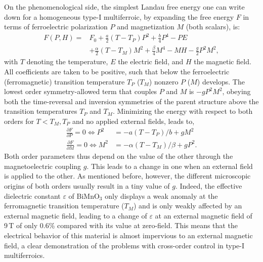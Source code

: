 On the phenomenological side, the simplest Landau free energy one can write down for a homogeneous type-I multiferroic, by expanding the free energy $F$ in terms of ferroelectric polarization $P$ and magnetization $M$ (both scalars), is:
\begin{align}
	F(P, H) =& F_0 + \frac{a}{2} (T-T_P) P^2 + \frac{b}{4} P^4 - P E \\
	&+\frac{\alpha}{2} (T-T_M)M^2 + \frac{\beta}{4} M^4 - MH - \frac{g}{2}P^2 M^2,
\end{align}
with $T$ denoting the temperature, $E$ the electric field, and $H$ the magnetic field.
All coefficients are taken to be positive, such that below the ferroelectric (ferromagnetic) transition temperature $T_P$ ($T_M$) nonzero $P$ ($M$) develops.
The lowest order symmetry-allowed term that couples $P$ and $M$ is $-gP^2M^2$, obeying both the time-reversal and inversion symmetries of the parent structure above the transition temperatures $T_P$ and $T_M$.
Minimizing the energy with respect to both orders for $T<T_M,T_P$ and no applied external fields, leads to,
\begin{align}
	\frac{\partial F}{\partial P} = 0 \Leftrightarrow P^2 &= - a(T-T_P)/b + gM^2\\
	\frac{\partial F}{\partial M} = 0 \Leftrightarrow M^2 &= - \alpha(T-T_M)/\beta + gP^2.
\end{align}
Both order parameters thus depend on the value of the other through the magnetoelectric coupling $g$. This leads to a change in one when an external field is applied to the other.
As mentioned before, however, the different microscopic origins of both orders usually result in a tiny value of $g$.
Indeed, the effective dielectric constant $\varepsilon$ of BiMnO$_3$ only displays a weak anomaly at the ferromagnetic transition temperature ($T_M$) and is only weakly affected by an external magnetic field, leading to a change of $\varepsilon$ at an external magnetic field of 9\,T of only 0.6\% compared with its value at zero-field.
This means that the electrical behavior of this material is almost impervious to an external magnetic field, a clear demonstration of the problems with cross-order control in type-I multiferroics.

